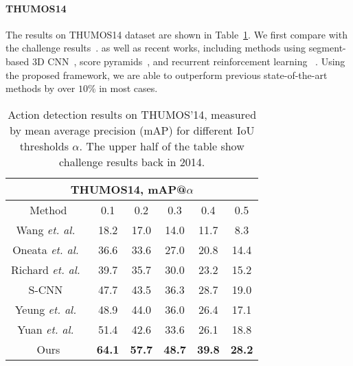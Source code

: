 \documentclass[10pt,twocolumn,letterpaper]{article}
\begin{document}
\vspace{-10pt}
\paragraph{THUMOS14}
The results on THUMOS14 dataset are shown in Table~\ref{table: thumos14}.
We first compare with the challenge results~\cite{wang2014action,oneata2014lear,Richard2016Language}. 
as well as recent works, including methods using segment-based 3D CNN~\cite{Shou2016SCNN}, 
score pyramids~\cite{Yuan2016ScorePyramids}, and recurrent reinforcement learning ~\cite{Yeung2016FrameGlimpse}.
Using the proposed framework, we are able to outperform previous state-of-the-art methods by over $ 10\% $ in most cases.

\begin{table}[t]
\begin{center}
\begin{tabular}{c|ccccc}
\hline
\multicolumn{6}{c}{\textbf{THUMOS14}, \textbf{mAP@$\alpha$}}                 \\ \hline
Method& 0.1  & 0.2  & 0.3  & 0.4  & 0.5  \\ \hline
Wang \emph{et. al.}~\cite{wang2014action} & 18.2 & 17.0 & 14.0 & 11.7 & 8.3 \\ \hline
Oneata \emph{et. al.}~\cite{oneata2014lear} & 36.6 & 33.6 & 27.0 &  20.8 & 14.4 \\ \hline
Richard \emph{et. al.}~\cite{Richard2016Language} & 39.7 & 35.7 & 30.0 & 23.2 & 15.2 \\ \hline\hline
S-CNN~\cite{Shou2016SCNN} & 47.7 & 43.5 & 36.3 & 28.7 & 19.0 \\ \hline
Yeung \emph{et. al.}~\cite{Yeung2016FrameGlimpse} & 48.9 & 44.0 & 36.0 & 26.4 & 17.1 \\ \hline
Yuan \emph{et. al.}~\cite{Yuan2016ScorePyramids} & 51.4 & 42.6& 33.6&26.1&18.8 \\\hline\hline
Ours & \textbf{64.1} & \textbf{57.7} & \textbf{48.7} & \textbf{39.8} & \textbf{28.2} \\
\hline
\end{tabular}
\end{center}
\caption{Action detection results on THUMOS’14, measured by mean average precision (mAP) for different IoU thresholds $\alpha$. The upper half of the table show challenge results back in 2014.}
\label{table: thumos14}
\end{table}


\vspace{-10pt}
\end{document}
